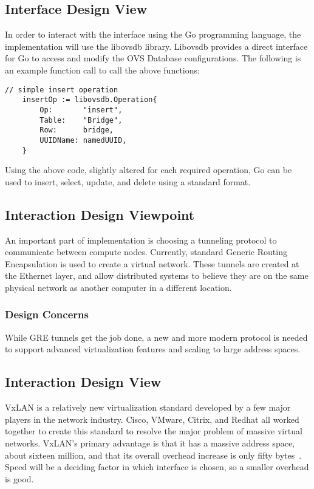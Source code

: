 \documentclass[10pt,onecolumn,journal,draftclsnofoot]{IEEEtran}
\begin{document}
\subsection{Interface Design View}
In order to interact with the interface using the Go programming language,
the implementation will use the libovsdb library\cite{libovsdb}. Libovsdb
provides a direct interface for Go to access and modify the OVS Database
configurations. The following is an example function call to call the above
functions:\cite{gosample}\\

\begin{lstlisting}[caption=Example insert operation in the OVS Database]
	// simple insert operation
	insertOp := libovsdb.Operation{
		Op:       "insert",
		Table:    "Bridge",
		Row:      bridge,
		UUIDName: namedUUID,
	}
\end{lstlisting}

Using the above code, slightly altered for each required operation, Go can
be used to insert, select, update, and delete using a standard format.
\subsection{Interaction Design Viewpoint}
An important part of implementation is choosing a tunneling protocol to
communicate between compute nodes. Currently, standard Generic Routing
Encapsulation is used to create a virtual network. These tunnels are created at
the Ethernet layer, and allow distributed systems to believe they are on the
same physical network as another computer in a different location.

\subsubsection{Design Concerns}
While GRE tunnels get the job done, a new and more modern protocol is needed to
support advanced virtualization features and scaling to large address spaces.

\subsection{Interaction Design View}
VxLAN is a relatively new virtualization standard developed by a few major
players in the network industry. Cisco, VMware, Citrix, and Redhat all worked
together to create this standard to resolve the major problem of massive
virtual networks. VxLAN's primary advantage is that it has a massive address
space, about sixteen million, and that its overall overhead increase is only
fifty bytes~\cite{vxlan}. Speed will be a deciding factor in which interface is
chosen, so a smaller overhead is good.
\end{document}
